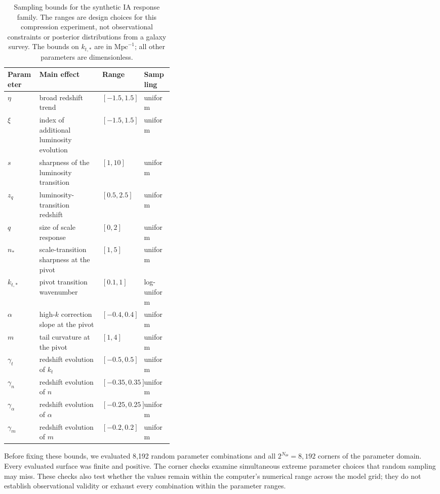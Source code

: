 \begin{table}[!htbp]
\centering
\caption{Sampling bounds for the synthetic IA response family. The
ranges are design choices for this compression experiment, not observational
constraints or posterior distributions from a galaxy survey.
The bounds on $k_{t,*}$ are in $\mathrm{Mpc}^{-1}$; all other parameters
are dimensionless.}
\label{tab:sampling-bounds}
\small
\begin{tabular}{@{}lp{0.38\linewidth}ll@{}}
\toprule
Parameter & Main effect & Range & Sampling \\
\midrule
$\eta$ & broad redshift trend & $[-1.5,1.5]$ & uniform \\
$\xi$ & index of additional luminosity evolution & $[-1.5,1.5]$ & uniform \\
$s$ & sharpness of the luminosity transition & $[1,10]$ & uniform \\
$z_q$ & luminosity-transition redshift & $[0.5,2.5]$ & uniform \\
$q$ & size of scale response & $[0,2]$ & uniform \\
$n_*$ & scale-transition sharpness at the pivot & $[1,5]$ & uniform \\
$k_{t,*}$ & pivot transition wavenumber & $[0.1,1]$ & log-uniform \\
$\alpha$ & high-$k$ correction slope at the pivot & $[-0.4,0.4]$ & uniform \\
$m$ & tail curvature at the pivot & $[1,4]$ & uniform \\
$\gamma_t$ & redshift evolution of $k_t$ & $[-0.5,0.5]$ & uniform \\
$\gamma_n$ & redshift evolution of $n$ & $[-0.35,0.35]$ & uniform \\
$\gamma_\alpha$ & redshift evolution of $\alpha$ & $[-0.25,0.25]$ & uniform \\
$\gamma_m$ & redshift evolution of $m$ & $[-0.2,0.2]$ & uniform \\
\bottomrule
\end{tabular}
\end{table}

Before fixing these bounds, we evaluated 8,192 random parameter
combinations and all $2^{N_\Theta}=8{,}192$ corners of the parameter domain.
Every evaluated surface was finite and positive. The corner checks
examine simultaneous extreme parameter choices that random sampling may
miss. These checks also test whether the values remain within the
computer's numerical range across the model grid; they do not
establish observational validity or exhaust every combination within the
parameter ranges.


